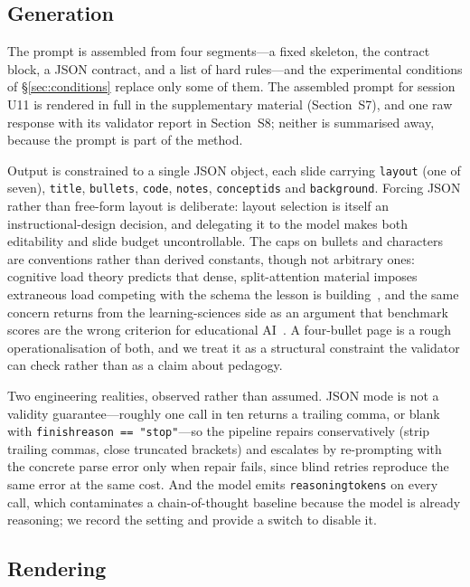 \documentclass[review,12pt]{elsarticle}
\renewcommand{\_}{\kgunderscore\allowbreak}
\newcommand{\id}[1]{\texttt{#1}}
\begin{document}
\subsection{Generation}

The prompt is assembled from four segments---a fixed skeleton, the contract
block, a JSON contract, and a list of hard rules---and the experimental
conditions of \S\ref{sec:conditions} replace only some of them. The assembled
prompt for session U11 is rendered in full in the supplementary material
(Section~S7), and one raw response with its validator report in Section~S8;
neither is summarised away, because the prompt is part of the method.

Output is constrained to a single JSON object, each slide carrying \id{layout}
(one of seven), \id{title}, \id{bullets}, \id{code}, \id{notes},
\id{concept\_ids} and \id{background}. Forcing JSON rather than free-form
layout is deliberate: layout selection is itself an instructional-design
decision, and delegating it to the model makes both editability and slide
budget uncontrollable. The caps on bullets and characters are conventions
rather than derived constants, though not arbitrary ones: cognitive load theory
predicts that dense, split-attention material imposes extraneous load
competing with the schema the lesson is building~\cite{sweller2025architecture},
and the same concern returns from the learning-sciences side as an argument
that benchmark scores are the wrong criterion for educational AI~\cite{roschelle2025beyond}.
A four-bullet page is a rough operationalisation of both, and we treat it as a
structural constraint the validator can check rather than as a claim about
pedagogy.

Two engineering realities, observed rather than assumed. JSON mode is not a
validity guarantee---roughly one call in ten returns a trailing comma, or blank
with \id{finish\_reason == "stop"}---so the pipeline repairs conservatively
(strip trailing commas, close truncated brackets) and escalates by re-prompting
with the concrete parse error only when repair fails, since blind retries
reproduce the same error at the same cost. And the model emits
\id{reasoning\_tokens} on every call, which contaminates a chain-of-thought
baseline because the model is already reasoning; we record the setting and
provide a switch to disable it.

\subsection{Rendering}
\end{document}

